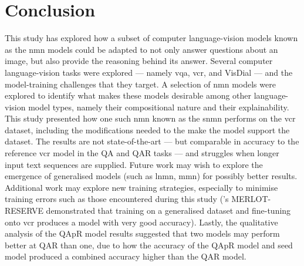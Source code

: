 \chapter{Conclusion}
\label{chp:conclusion}

This study has explored how a subset of computer language-vision models known as the \gls{nmn} models could be adapted to not only answer questions about an image, but also provide the reasoning behind its answer.
Several computer language-vision tasks were explored --- namely \gls{vqa}, \gls{vcr}, and VisDial --- and the model-training challenges that they target.
A selection of \gls{nmn} models were explored to identify what makes these models desirable among other language-vision model types, namely their compositional nature and their explainability.
This study presented how one such \gls{nmn} known as the \gls{snmn} performs on the \gls{vcr} dataset, including the modifications needed to the make the model support the dataset.
The results are not state-of-the-art --- but comparable in accuracy to the reference \gls{vcr} model in the Q\rightarrow{}A and QA\rightarrow{}R tasks --- and struggles when longer input text sequences are supplied.
Future work may wish to explore the emergence of generalised models (such as \gls{lnmn}, \gls{mmn}) for possibly better results.
Additional work may explore new training strategies, especially to minimise training errors such as those encountered during this study (\citeauthor{zellers_merlot_2022}'s MERLOT-RESERVE demonstrated that training on a generalised dataset and fine-tuning onto \gls{vcr} produces a model with very good accuracy).
Lastly, the qualitative analysis of the QAp\rightarrow{}R model results suggested that two models may perform better at Q\rightarrow{}AR than one, due to how the accuracy of the QAp\rightarrow{}R model and seed model produced a combined accuracy higher than the Q\rightarrow{}AR model.
